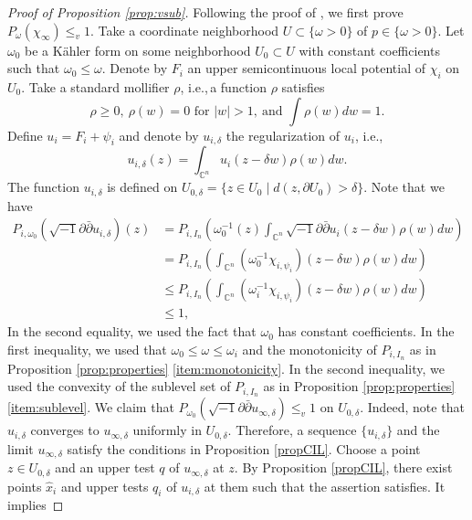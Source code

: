 \documentclass[10pt,a4paper]{amsart}
\numberwithin{equation}{section}
\newcommand{\delb}{\sqrt{-1}\partial\bar{\partial}}
\begin{document}
\begin{proof}[Proof of Proposition \ref{prop:vsub}]
    Following the proof of \cite[Proposition 21]{CS17}, we first prove $P_\omega(\chi_\infty)\le_v1$.
    Take a coordinate neighborhood $U\subset\{\omega>0\}$ of $p\in\{\omega>0\}$. Let $\omega_0$ be a K{\"a}hler form on some neighborhood $U_0 \subset U$ with constant coefficients such that $\omega_0 \le \omega$. Denote by $F_i$ an upper semicontinuous local potential of $\chi_i$ on $U_0$. Take a standard mollifier $\rho$, i.e.,\,a function $\rho$ satisfies $$\rho\ge0, \ \rho(w)=0 \text{ for $|w|>1$},\ \text{and } \int\rho(w)dw=1.$$ Define $u_{i}=F_i+\psi_i$ and denote by $u_{i,\delta}$ the regularization of $u_i$, i.e.,
    \begin{equation*}
        u_{i,\delta}(z)=\int_{\mathbb{C}^n} u_i(z-\delta w)\rho(w)dw.
    \end{equation*}
    The function $u_{i,\delta}$ is defined on $U_{0,\delta} =\{z\in U_0\mid d(z,\partial U_0)> \delta \}.$
    Note that we have
    \begin{equation*}
        \begin{split}
        P_{i,\omega_0}(\delb u_{i,\delta})(z)
        &=P_{i,I_n}\left(\omega^{-1}_0(z) \int_{\mathbb{C}^n}\delb u_i(z-\delta w)\rho(w)dw
        \right)\\
        &=P_{i,I_n}\left( \int_{\mathbb{C}^n}(\omega^{-1}_0 \chi_{i,\psi_i})(z-\delta w)\rho(w)dw
        \right)\\
        &\le P_{i,I_n}\left( \int_{\mathbb{C}^n}(\omega^{-1}_i \chi_{i,\psi_i})(z-\delta w)\rho(w)dw
        \right)\\
        &\le 1,
        \end{split}
    \end{equation*}
    In the second equality, we used the fact that $\omega_0$ has constant coefficients. In the first inequality, we used that $\omega_0\le \omega\le\omega_i$ and the monotonicity of $P_{i,I_n}$ as in Proposition \ref{prop:properties} \ref{item:monotonicity}. In the second inequality, we used the convexity of the sublevel set of $P_{i,I_n}$ as in Proposition \ref{prop:properties} \ref{item:sublevel}. We claim that $P_{\omega_0}(\delb u_{\infty,\delta})\le_v 1$ on $U_{0,\delta}$.
    Indeed, note that $u_{i,\delta}$ converges to $u_{\infty,\delta}$ uniformly in $U_{0,\delta}$. Therefore, a sequence $\{ u_{i,\delta}\}$ and the limit $u_{\infty,\delta}$ satisfy the conditions in Proposition \ref{propCIL}. Choose a point $z \in U_{0,\delta}$ and an upper test $q$ of $u_{\infty,\delta}$ at $z$. By Proposition \ref{propCIL}, there exist points $\hat{x}_i$ and upper tests $q_i$ of $u_{i,\delta}$ at them such that the assertion satisfies. It implies 

\end{proof}
\end{document}
